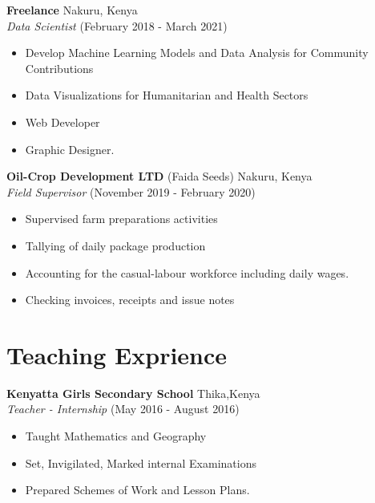 \documentclass[line,margin,10pt]{res}
\begin{document}
\begin{resume}
\textbf{Freelance} \hfill Nakuru, Kenya\\
{\sl Data Scientist} \hfill (February 2018 - March 2021)
\begin{itemize} \itemsep -2pt
    \item Develop Machine Learning Models and Data Analysis for Community Contributions
    \item Data Visualizations for Humanitarian and Health Sectors
    \item Web Developer
    \item Graphic Designer.
\end{itemize}

\textbf{Oil-Crop Development LTD} (Faida Seeds) \hfill Nakuru, Kenya\\
{\sl Field Supervisor} \hfill (November 2019 - February 2020)
\begin{itemize} \itemsep -2pt
    \item Supervised farm preparations activities
    \item Tallying of daily package production
    \item Accounting for the casual-labour workforce including daily wages.
    \item Checking invoices, receipts and issue notes
\end{itemize}
{\vspace{-0.25cm}}

\section{Teaching Exprience}
\textbf{Kenyatta Girls Secondary School} \hfill Thika,Kenya\\
{\sl Teacher - Internship} \hfill (May 2016 - August 2016)
\begin{itemize} \itemsep -2pt
    \item Taught Mathematics and Geography
    \item Set, Invigilated, Marked internal Examinations
    \item Prepared Schemes of Work and Lesson Plans.
\end{itemize}
{\vspace{-0.25cm}}


\end{resume}
\end{document}
